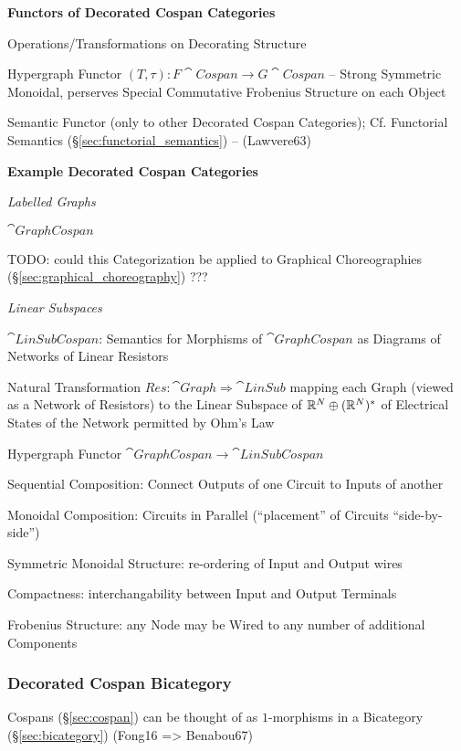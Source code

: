 \textbf{Functors of Decorated Cospan Categories}


Operations/Transformations on Decorating Structure

Hypergraph Functor $(T,\tau) : F\cat{Cospan} \rightarrow
G\cat{Cospan}$ -- Strong Symmetric Monoidal, perserves Special
Commutative Frobenius Structure on each Object

Semantic Functor (only to other Decorated Cospan Categories); \fist
Cf. Functorial Semantics (\S\ref{sec:functorial_semantics}) --
(Lawvere63)


\textbf{Example Decorated Cospan Categories}


\emph{Labelled Graphs}

$\cat{GraphCospan}$

TODO: could this Categorization be applied to Graphical Choreographies
(\S\ref{sec:graphical_choreography}) ???


\emph{Linear Subspaces}

$\cat{LinSubCospan}$: Semantics for Morphisms of $\cat{GraphCospan}$
as Diagrams of Networks of Linear Resistors

Natural Transformation $Res : \cat{Graph} \Rightarrow \cat{LinSub}$
mapping each Graph (viewed as a Network of Resistors) to the Linear
Subspace of $\mathbb{R}^N \oplus (\mathbb{R}^N)^*$ of Electrical States of the
Network permitted by Ohm's Law

Hypergraph Functor $\cat{GraphCospan} \rightarrow \cat{LinSubCospan}$

Sequential Composition: Connect Outputs of one Circuit to Inputs of
another

Monoidal Composition: Circuits in Parallel (``placement'' of Circuits
``side-by-side'')

Symmetric Monoidal Structure: re-ordering of Input and Output wires

Compactness: interchangability between Input and Output Terminals

Frobenius Structure: any Node may be Wired to any number of additional
Components



\subsubsection{Decorated Cospan Bicategory}
\label{sec:decorated_cospan_bicategory}

Cospans (\S\ref{sec:cospan}) can be thought of as $1$-morphisms in a
Bicategory (\S\ref{sec:bicategory}) (Fong16 => Benabou67)

